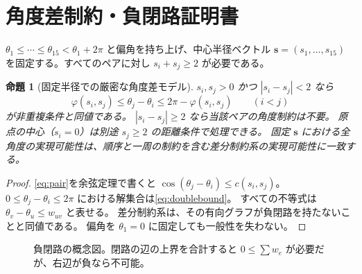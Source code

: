 \documentclass[11pt,a4paper]{article}
\theoremstyle{JPthm}
\newtheorem{proposition}[theorem]{命題}
\theoremstyle{definition}
\newcommand{\ph}{\varphi}
\begin{document}
\section{角度差制約・負閉路証明書}
$\theta_1\le\cdots\le\theta_{15}<\theta_1+2\pi$ と偏角を持ち上げ、中心半径ベクトル
$\boldsymbol s=(s_1,\ldots,s_{15})$ を固定する。すべてのペアに対し $s_i+s_j\ge2$ が必要である。

\begin{proposition}[固定半径での厳密な角度差モデル]\label{prop:diff}
$s_i,s_j>0$ かつ $|s_i-s_j|<2$ なら
\begin{equation}\label{eq:doublebound}
\ph(s_i,s_j)\le\theta_j-\theta_i\le2\pi-\ph(s_i,s_j)
\qquad(i<j)
\end{equation}
が非重複条件と同値である。
$|s_i-s_j|\ge2$ なら当該ペアの角度制約は不要。
原点の中心（$s_i=0$）は別途 $s_j\ge2$ の距離条件で処理できる。
固定 $\boldsymbol s$ における全角度の実現可能性は、順序と一周の制約を含む差分制約系の実現可能性に一致する。
\end{proposition}
\begin{proof}
\eqref{eq:pair}を余弦定理で書くと $\cos(\theta_j-\theta_i)\le c(s_i,s_j)$。
$0\le\theta_j-\theta_i\le2\pi$ における解集合は\eqref{eq:doublebound}。
すべての不等式は $\theta_v-\theta_u\le w_{uv}$ と表せる。
差分制約系は、その有向グラフが負閉路を持たないことと同値である。
偏角を $\theta_1=0$ に固定しても一般性を失わない。
\end{proof}

\begin{figure}[H]
\centering
{}
\caption{負閉路の概念図。閉路の辺の上界を合計すると $0\le\sum w_e$ が必要だが、右辺が負なら不可能。}
\label{fig:cycle}
\end{figure}
\end{document}
